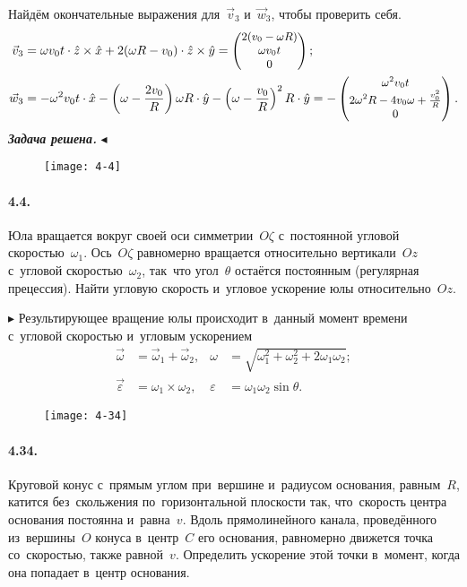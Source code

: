 \documentclass{weekly}
\begin{document}
Найдём окончательные выражения
для~$\vec v_3$ и~$\vec w_3$, чтобы проверить себя.
\begin{align}
    \vec v_3 &= \omega v_0 t \cdot \hat z \times \hat x +
            2(\omega R - v_0) \cdot \hat z \times \hat y
        = \small\begin{pmatrix}2(v_0 - \omega R)\\\omega v_0 t\\0\end{pmatrix}; \\
    \vec w_3 &= -\omega^2 v_0 t \cdot \hat x -
            \left(\omega - \frac{2v_0}{R}\right)\omega R \cdot \hat y-
            \left(\omega - \frac{v_0}{R}\right)^2 R \cdot \hat y
        = -\small\begin{pmatrix}\omega^2 v_0 t\\2\omega^2 R - 4v_0 \omega +
            \frac{v_0^2}{R}\\0\end{pmatrix}.
\end{align}
\textbf{\textit{Задача решена.}} \hfill $\blacktriangleleft$


\begin{wrapfigure}[6]{r}{3.3cm}\vspace{-6mm}
    \texttt{[image: 4-4]}
\end{wrapfigure}
\paragraph{4.4.} Юла вращается вокруг своей оси симметрии~$O\zeta$
с~постоянной угловой скоростью~$\omega_1$. Ось~$O\zeta$
равномерно вращается относительно вертикали~$Oz$ с~угловой
скоростью~$\omega_2$, так~что угол~$\theta$ остаётся постоянным
(регулярная прецессия). Найти угловую скорость и~угловое ускорение
юлы относительно~$Oz$.

$\blacktriangleright$ Результирующее вращение юлы происходит
в~данный момент времени с~угловой скоростью и~угловым ускорением
\begin{align*}
    \vec\omega &= \vec\omega_1 + \vec\omega_2, &
    \omega &= \sqrt{\omega_1^2 + \omega_2^2 + 2\omega_1\omega_2};
\\\tag*{$\blacktriangleleft$}
    \vec\varepsilon &= \omega_1 \times \omega_2, &
    \varepsilon &= \omega_1 \omega_2 \sin\theta.
\end{align*}


\clearpage
\begin{wrapfigure}[7]{r}{5.5cm}\vspace{3mm}
    \texttt{[image: 4-34]}
\end{wrapfigure}
\paragraph{4.34.} Круговой конус с~прямым углом при~вершине
и~радиусом основания, равным~$R$, катится без~скольжения
по~горизонтальной плоскости так, что~скорость центра основания
постоянна и~равна~$v$. Вдоль прямолинейного канала, проведённого
из~вершины~$O$ конуса в~центр~$C$ его основания, равномерно
движется точка со~скоростью, также равной~$v$. Определить
ускорение этой точки в~момент, когда она попадает в~центр основания.
\end{document}
